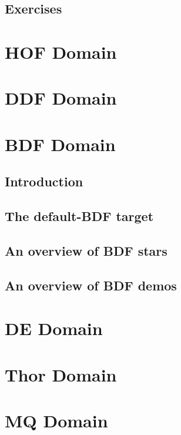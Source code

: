 \section{Exercises}
\label{SDF.Exercises}

\chapter{HOF Domain}
\label{HOF.Domain}

\chapter{DDF Domain}
\label{DDF.Domain}

\chapter{BDF Domain}
\label{BDF.Domain}

\section{Introduction}
\label{BDF.Introduction}

\section{The default-BDF target}
\label{BDF.Targets}

\section{An overview of BDF stars}
\label{BDF.Star.Overview}

\section{An overview of BDF demos}
\label{BDF.Demo.Overview}

\chapter{DE Domain}
\label{DE.Domain}

\chapter{Thor Domain}
\label{Thor.Domain}

\chapter{MQ Domain}
\label{MQ.Domain}

